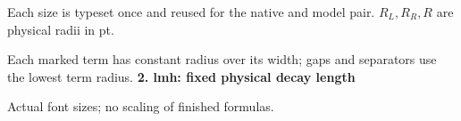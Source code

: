 \documentclass{article}
\newcommand\High{\frac{\displaystyle\sum_{k=1}^n x_k}{1+\frac pq}}
\newcommand\Medium{\frac{x^2+y^2}{z}}
\newcommand\Mark[1]{\directlua{grid.mark(#1)}}
\begin{document}
\par\medskip
Each size is typeset once and reused for the native and model pair. $R_L,R_R,R$ are physical radii in pt.\par
Each marked term has constant radius over its width; gaps and separators use the lowest term radius.
\newpage
{\Large\bfseries 2. lmh: fixed physical decay length}\par\medskip
{} Actual font sizes; no scaling of finished formulas.\par\medskip
\end{document}
